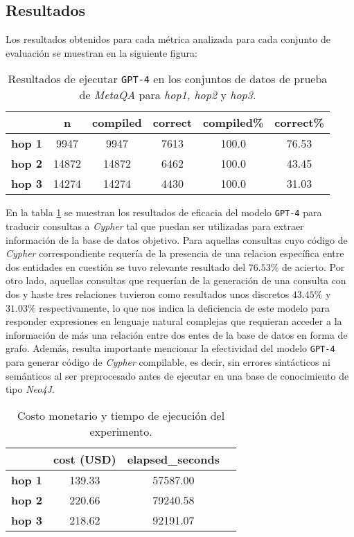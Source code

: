 \subsection{Resultados}

Los resultados obtenidos para cada métrica analizada para cada conjunto de evaluación se muestran en la siguiente figura:

\begin{table}[H]
\centering
\begin{tabular}{|c|c|c|c|c|c|}
\hline
 & \textbf{n} & \textbf{compiled} & \textbf{correct} & \textbf{compiled\%} & \textbf{correct\%} \\ \hline
\textbf{hop 1} & 9947 & 9947 & 7613 & 100.0 & 76.53  \\ \hline
\textbf{hop 2} & 14872 & 14872 & 6462 & 100.0 & 43.45  \\ \hline
\textbf{hop 3} & 14274 & 14274 & 4430 & 100.0 & 31.03  \\ \hline
\end{tabular}
\caption{Resultados de ejecutar \texttt{GPT-4} en los conjuntos de datos de prueba de \textit{MetaQA} para \textit{hop1, hop2} y \textit{hop3}.}
\label{tab:results1}
\end{table}

En la tabla \ref{tab:results1} se muestran los resultados de eficacia del modelo \texttt{GPT-4} para traducir consultas a \textit{Cypher} tal que puedan ser utilizadas para extraer información de la base de datos objetivo. Para aquellas consultas cuyo código de \textit{Cypher} correspondiente requería de la presencia de una relacion específica entre dos entidades en cuestión se tuvo relevante resultado del $76.53\%$ de acierto. Por otro lado, aquellas consultas que requerían de la generación de una consulta con dos y haste tres relaciones tuvieron como resultados unos discretos $43.45\%$ y $31.03\%$ respectivamente, lo que nos indica la deficiencia de este modelo para responder expresiones en lenguaje natural complejas que requieran acceder a la información de más una relación entre dos entes de la base de datos en forma de grafo. Además, resulta importante mencionar la efectividad del modelo \texttt{GPT-4} para generar código de \textit{Cypher} compilable, es decir, sin errores sintácticos ni semánticos al ser preprocesado antes de ejecutar en una base de conocimiento de tipo \textit{Neo4J}. 
 
\begin{table}[H]
\centering
\begin{tabular}{|c|c|c|c|}
\hline
 & \textbf{cost (USD)} & \textbf{elapsed\_seconds} \\ \hline
\textbf{hop 1} & 139.33 & 57587.00 \\ \hline
\textbf{hop 2} & 220.66 & 79240.58 \\ \hline
\textbf{hop 3} & 218.62 & 92191.07 \\ \hline
\end{tabular}
\caption{Costo monetario y tiempo de ejecución del experimento.}
\label{tab:results2}
\end{table}

